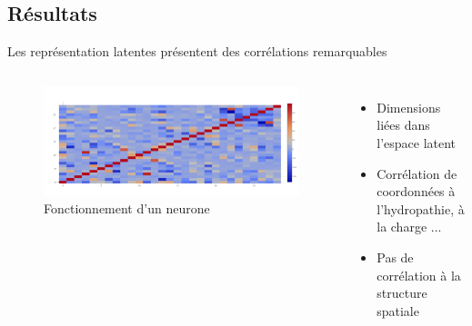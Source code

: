 \documentclass{beamer}
\begin{document}
\subsection{Résultats}

\begin{frame}{Les représentation latentes présentent des corrélations remarquables}

  \begin{columns}
    \begin{figure}
      \centering
      \includegraphics[scale=0.1750]{../Figures/SingleOneRecHeat}
      \caption{Fonctionnement d'un neurone}
    \end{figure}

    \begin{itemize}
    \item Dimensions liées dans l'espace latent\pause
    \item Corrélation de coordonnées à l'hydropathie, à la charge ...\pause
    \item Pas de corrélation à la structure spatiale\pause
    \end{itemize}
  \end{columns}

\end{frame}
\end{document}
